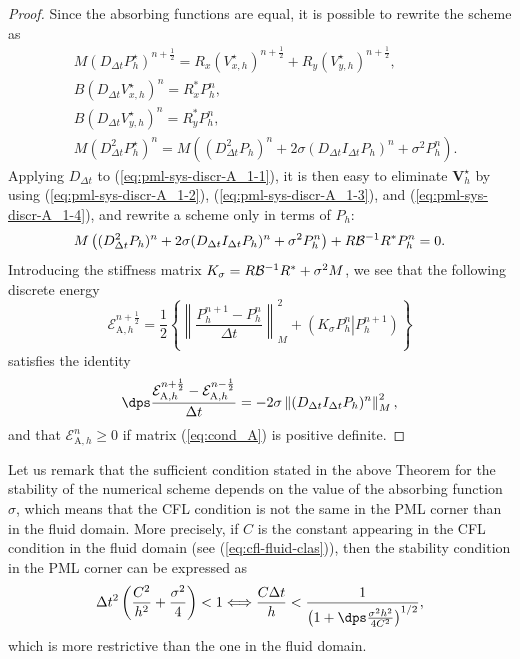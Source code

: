 \documentclass[a4paper]{article}
\def\bVs{\boldsymbol{V}^{\star}}
\def\Vs{V^{\star}}
\def\Ps{P^{\star}}
\begin{document}
\begin{proof}
Since the absorbing functions are equal, it is possible to rewrite the
scheme as
\begin{align}
&M(D_{\Delta t}\Ps_{h})^{n+\frac12}=
 R_{x}(\Vs_{x,h})^{n+\frac12}+R_{y}(\Vs_{y,h})^{n+\frac12},\label{eq:pml-sys-discr-A_1-1}\\
&B  (D_{\Delta t}\Vs_{x,h})^{n}=R_{x}^{*}P_{h}^{n},\label{eq:pml-sys-discr-A_1-2}\\
&B(D_{\Delta t}\Vs_{y,h})^{n}=R_{y}^{*}P_{h}^{n},\label{eq:pml-sys-discr-A_1-3}\\
&M(D_{\Delta t}^{2}\Ps_{h})^{n}=M\left((D_{\Delta t}^2
P_{h})^{n}+ 2 \sigma (D_{\Delta t} I_{\Delta t}
{P_{h}})^{n}+ \sigma^2 P_{h}^{n}\right).\label{eq:pml-sys-discr-A_1-4}
\end{align}
Applying $D_{\Delta t} $ to (\ref{eq:pml-sys-discr-A_1-1}), it is then
easy to eliminate $\bVs_h$ by using 
(\ref{eq:pml-sys-discr-A_1-2}), (\ref{eq:pml-sys-discr-A_1-3}), 
and (\ref{eq:pml-sys-discr-A_1-4}), and rewrite a scheme only in terms 
of $P_{h}$:
\[
M\left( (D_{\Delta t}^2
P_{h})^{n}+ 2 \sigma (D_{\Delta t} I_{\Delta t}
{P_{h}})^{n}+ \sigma^2 P_{h}^{n}\right)+ R {\cal B}^{-1} R^{*} P_{h}^{n}=0.
\]
Introducing the stiffness matrix 
$K_\sigma = R {\cal B}^{-1} R^{*} + \sigma^2 M$, 
we see that the following discrete energy 
\[
\mathcal{E}_{\mathrm{A},h}^{n+\frac12}=
\frac12\left\{ \left\| \frac{P_{h}^{n+1}- P_{h}^{n}}{\Delta
      t}\right\|_M^2 + (K_\sigma P_{h}^{n}    \left. \right| P_{h}^{n+1})
\right\}
\]
satisfies the identity
\[
\dps \frac{ \mathcal{E}_{\mathrm{A},h}^{n+\frac12}-
  \mathcal{E}_{\mathrm{A},h}^{n-\frac12}}{\Delta t}= -2 \sigma \left\| 
(D_{\Delta t} I_{\Delta t}{P_{h}})^{n} \right\|_M^2,
\]
and that 
$\mathcal{E}_{\mathrm{A},h}^{n}\ge 0$ if matrix (\ref{eq:cond_A})
is positive definite. 
\end{proof}

Let us remark that the sufficient condition stated in the above Theorem for the stability of the numerical scheme depends on the value
of the absorbing function $\sigma$, which means that  the CFL condition is not the same in the PML
corner than in the fluid domain. More
precisely,  if ${C}$ is the constant appearing in the CFL
condition in the fluid domain (see (\ref{eq:cfl-fluid-clas})), then the
stability condition in the PML corner can be expressed as
\begin{equation}
\label{eq:cfl-pml-A}
\Delta t^2 \left( \frac{{C}^2}{h^2} + \frac{\sigma^2}{4}\right)  <1
\Longleftrightarrow  \frac{{C} \Delta t}{h} < \frac{1}{\left(1+
  \dps \frac{\sigma^2 h^2}{4 {C}^2} \right)^{1/2}},
\end{equation}
which is more restrictive than the one in the fluid domain. 
\end{document}
